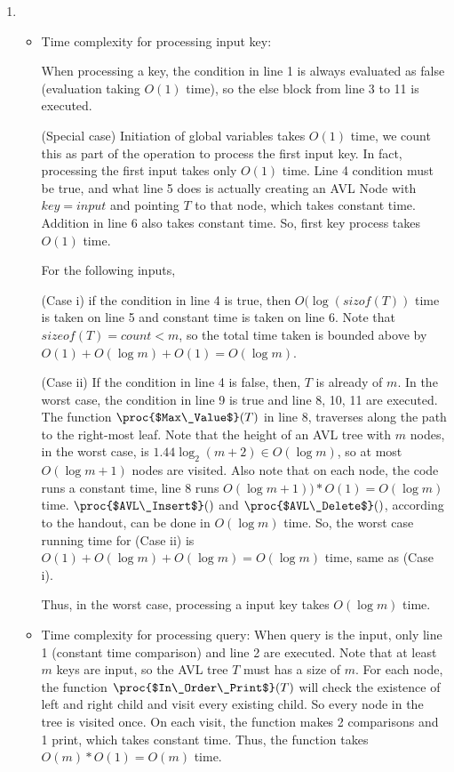 \documentclass[11pt, answers]{exam}
\theoremstyle{plain}
\theoremstyle{definition}
\begin{document}
\begin{questions}
\begin{solution}
\begin{enumerate}
\item 
\begin{itemize}
\item Time complexity for processing input key:

When processing a key, the condition in line 1 is always evaluated as false (evaluation taking $O(1)$ time), so the else block from line 3 to 11 is executed.

(Special case) Initiation of global variables takes $O(1)$ time, we count this as part of the operation to process the first input key.
In fact, processing the first input takes only $O(1)$ time. Line 4 condition must be true, and what line 5 does is actually creating an AVL Node with $key=input$ and pointing $T$ to that node, which takes constant time. Addition in line 6 also takes constant time. So, first key process takes $O(1)$ time.

For the following inputs, 

(Case i) if the condition in line 4 is true, then $O(\log{(sizof(T))}$ time is taken on line 5 and constant time is taken on line 6. Note that $sizeof(T) =count< m$, so the total time taken is bounded above by $O(1)+O(\log{m})+O(1)=O(\log{m})$. 

(Case ii) If the condition in line 4 is false, then, $T$ is already of $m$. In the worst case, the condition in line 9 is true and line 8, 10, 11 are executed. The function $\proc{$Max\_Value$}(T)$ in line 8, traverses along the path to the right-most leaf. 
Note that the height of an AVL tree with $m$ nodes, in the worst case, is $1.44\log_2{(m+2)}\in O(\log{m})$, so at most $O(\log{m}+1)$ nodes are visited. Also note that on each node, the code runs a constant time, line 8 runs $O(\log{m}+1))*O(1) = O(\log{m})$ time.
$\proc{$AVL\_Insert$}()$ and $\proc{$AVL\_Delete$}()$, according to the handout, can be done in $O(\log{m})$ time. So, the worst case running time for (Case ii) is $O(1)+O(\log{m})+O(\log{m}) = O(\log{m})$ time, same as (Case i).

Thus, in the worst case, processing a input key takes $O(\log{m})$ time.

\item Time complexity for processing query:
When query is the input, only line 1 (constant time comparison) and line 2 are executed. Note that at least $m$ keys are input, so the AVL tree $T$ must has a size of $m$. For each node, the function $\proc{$In\_Order\_Print$}(T)$ will check the existence of left and right child and visit every existing child. So every node in the tree is visited once. On each visit, the function makes 2 comparisons and 1 print, which takes constant time. Thus, the function takes $O(m) * O(1)=O(m)$ time.
\end{itemize}
\end{enumerate}

\end{solution}

\end{questions}
\end{document}

